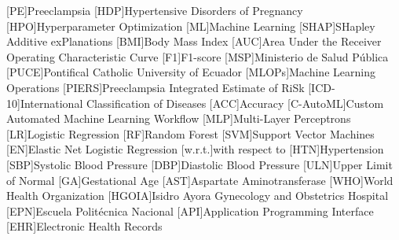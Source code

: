 \documentclass[diagnostics,article,submit,pdftex,moreauthors]{Definitions/mdpi}
\begin{document}
\begin{acronym}
    [PE]{Preeclampsia}
    [HDP]{Hypertensive Disorders of Pregnancy}
    [HPO]{Hyperparameter Optimization}
    [ML]{Machine Learning}
    [SHAP]{SHapley Additive exPlanations}
    [BMI]{Body Mass Index}
    [AUC]{Area Under the Receiver Operating Characteristic Curve}
    [F1]{F1-score}
    [MSP]{Ministerio de Salud Pública}
    [PUCE]{Pontifical Catholic University of Ecuador}
    [MLOPs]{Machine Learning Operations}
    [PIERS]{Preeclampsia Integrated Estimate of RiSk}
    [ICD-10]{International Classification of Diseases}
    [ACC]{Accuracy}
    [C-AutoML]{Custom Automated Machine
      Learning Workflow}
    [MLP]{Multi-Layer Perceptrons}
    [LR]{Logistic Regression}
    [RF]{Random Forest}
    [SVM]{Support Vector Machines}
    [EN]{Elastic Net Logistic Regression}
    [w.r.t.]{with respect to}
    [HTN]{Hypertension}
    [SBP]{Systolic Blood Pressure}
    [DBP]{Diastolic Blood Pressure}
    [ULN]{Upper Limit of Normal}
    [GA]{Gestational Age}
    [AST]{Aspartate Aminotransferase}
    [WHO]{World Health Organization}
    [HGOIA]{Isidro Ayora Gynecology and Obstetrics Hospital}
    [EPN]{Escuela Politécnica Nacional}
    [API]{Application Programming Interface}
    [EHR]{Electronic Health Records}
\end{acronym}
  
  

\end{document}
